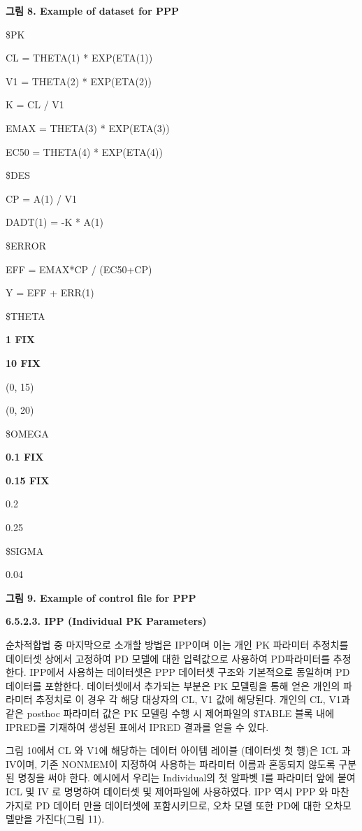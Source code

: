 \documentclass[
  10pt,
]{krantz}
\begin{document}
\textbf{그림 8. Example of dataset for PPP}

\$PK

CL = THETA(1) * EXP(ETA(1))

V1 = THETA(2) * EXP(ETA(2))

K = CL / V1

EMAX = THETA(3) * EXP(ETA(3))

EC50 = THETA(4) * EXP(ETA(4))

\$DES

CP = A(1) / V1

DADT(1) = -K * A(1)

\$ERROR

EFF = EMAX*CP / (EC50+CP)

Y = EFF + ERR(1)

\$THETA

\textbf{1 FIX}

\textbf{10 FIX}

(0, 15)

(0, 20)

\$OMEGA

\textbf{0.1 FIX}

\textbf{0.15 FIX}

0.2

0.25

\$SIGMA

0.04

\textbf{그림 9. Example of control file for PPP}

\textbf{6.5.2.3. IPP (Individual PK Parameters)}

순차적합법 중 마지막으로 소개할 방법은 IPP이며 이는 개인 PK 파라미터 추정치를 데이터셋 상에서 고정하여 PD 모델에 대한
입력값으로 사용하여 PD파라미터를 추정한다. IPP에서 사용하는 데이터셋은 PPP 데이터셋 구조와 기본적으로 동일하며 PD
데이터를 포함한다. 데이터셋에서 추가되는 부분은 PK 모델링을 통해 얻은 개인의 파라미터 추정치로 이 경우 각 해당 대상자의
CL, V1 값에 해당된다. 개인의 CL, V1과 같은 posthoc 파라미터 값은 PK 모델링 수행 시 제어파일의 \$TABLE
블록 내에 IPRED를 기재하여 생성된 표에서 IPRED 결과를 얻을 수 있다.

그림 10에서 CL 와 V1에 해당하는 데이터 아이템 레이블 (데이터셋 첫 행)은 ICL 과 IV이며, 기존 NONMEM이
지정하여 사용하는 파라미터 이름과 혼동되지 않도록 구분된 명칭을 써야 한다. 예시에서 우리는 Individual의
첫 알파벳 I를 파라미터 앞에 붙여 ICL 및 IV 로 명명하여 데이터셋 및 제어파일에 사용하였다. IPP 역시 PPP 와
마찬가지로 PD 데이터 만을 데이터셋에 포함시키므로, 오차 모델 또한 PD에 대한 오차모델만을 가진다(그림 11).
\end{document}
